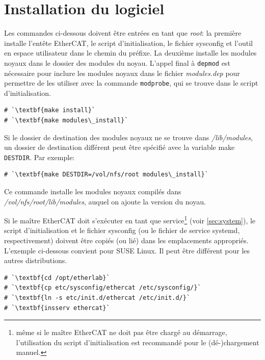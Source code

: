 \documentclass[a4paper,12pt,BCOR6mm,bibtotoc,idxtotoc]{scrbook}
\begin{document}
\section{Installation du logiciel}

Les commandes ci-dessous doivent \^etre entr\'ees en tant que
\textit{root}: la premi\`ere installe l'ent\^ete EtherCAT, le script
d'initialisation, le fichier sysconfig et l'outil en espace
utilisateur dans le chemin du pr\'efixe.  La deuxi\`eme installe les
modules noyaux dans le dossier des modules du noyau.  L'appel final
\`a \lstinline+depmod+ est n\'ecessaire pour inclure les modules
noyaux dans le fichier \textit{modules.dep} pour permettre de les
utiliser avec la commande \lstinline+modprobe+, qui se trouve dans le
script d'initialisation.

\begin{lstlisting}
# `\textbf{make install}`
# `\textbf{make modules\_install}`
\end{lstlisting}

Si le dossier de destination des modules noyaux ne se trouve dans
\textit{/lib/modules}, un dossier de destination diff\'erent peut \^etre
sp\'ecifi\'e avec la variable make \lstinline+DESTDIR+. Par exemple:

\begin{lstlisting}
# `\textbf{make DESTDIR=/vol/nfs/root modules\_install}`
\end{lstlisting}

Ce commande installe les modules noyaux compil\'es dans
\textit{/vol/nfs/root/lib/modules}, auquel on ajoute la version du
noyau.

Si le ma\^itre EtherCAT doit s'ex\'ecuter en tant que
service\footnote{ m\^eme si le ma\^itre EtherCAT ne doit pas \^etre
  charg\'e au d\'emarrage, l'utilisation du script d'initialisation
  est recommand\'e pour le (d\'e-)chargement manuel.} (voir
\autoref{sec:system}), le script d'initialisation et le fichier
sysconfig (ou le fichier de service systemd, respectivement) doivent
\^etre copi\'es (ou li\'e) dans les emplacements appropri\'es.
L'exemple ci-dessous convient pour SUSE Linux.  Il peut \^etre
diff\'erent pour les autres distributions.

\begin{lstlisting}
# `\textbf{cd /opt/etherlab}`
# `\textbf{cp etc/sysconfig/ethercat /etc/sysconfig/}`
# `\textbf{ln -s etc/init.d/ethercat /etc/init.d/}`
# `\textbf{insserv ethercat}`
\end{lstlisting}
\end{document}
